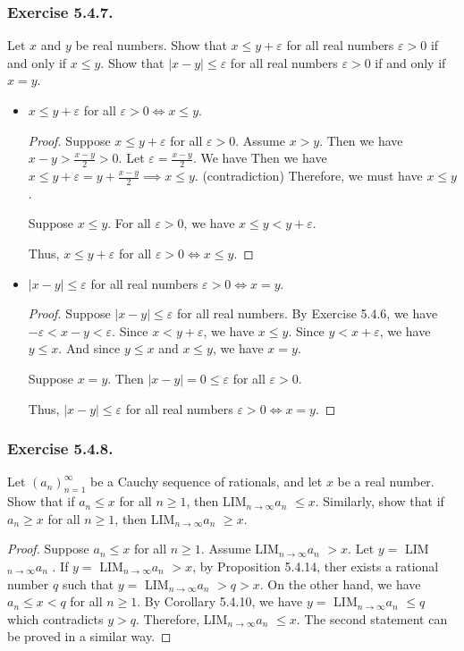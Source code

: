 \documentclass[12pt, letter]{article}
\newcommand{\an}{$(a_n)_{n=1}^\infty$ }
\newcommand{\la}{LIM$_{n\to\infty}a_n$  }
\begin{document}
\subsubsection*{Exercise 5.4.7.}
Let $x$ and $y$ be real numbers. Show that $x\leq y+\varepsilon$ for all real numbers $\varepsilon>0$ if and only if $x\leq y$. Show that $|x-y|\leq \varepsilon$
for all real numbers $\varepsilon>0$ if and only if $x=y$.
\begin{itemize}
    \item $x\leq y+\varepsilon$ for all $\varepsilon>0\iff x\leq y$.
    \begin{proof}
        Suppose $x\leq y+\varepsilon$ for all $\varepsilon>0$. Assume $x>y$. Then we have $x-y>\frac{x-y}{2}>0$. Let $\varepsilon=\frac{x-y}{2}$. We have 
        Then we have $x\leq y+\varepsilon=y+\frac{x-y}{2}\implies x\leq y$. (contradiction) Therefore, we must have $x\leq y$.

        Suppose $x\leq y$. For all $\varepsilon>0$, we have $x\leq y<y+\varepsilon$.

        Thus, $x\leq y+\varepsilon$ for all $\varepsilon>0\iff x\leq y$.
    \end{proof}
    \item $|x-y|\leq \varepsilon$ for all real numbers $\varepsilon>0 \iff x=y$.
    \begin{proof}
        Suppose $|x-y|\leq \varepsilon$ for all real numbers. By Exercise 5.4.6, we have $-\varepsilon<x-y<\varepsilon$. Since $x<y+\varepsilon$, we have $x\leq y$.
        Since $y<x+\varepsilon$, we have $y\leq x$. And since $y\leq x$ and $x\leq y$, we have $x=y$.

        Suppose $x=y$. Then $|x-y|=0\leq \varepsilon$ for all $\varepsilon>0$.

        Thus, $|x-y|\leq \varepsilon$ for all real numbers $\varepsilon>0 \iff x=y$.
    \end{proof}
\end{itemize}
\subsubsection*{Exercise 5.4.8.}
Let \an be a Cauchy sequence of rationals, and let $x$ be a real number. Show that if $a_n\leq x$ for all $n\geq 1$, then \la $\leq x$. Similarly, 
show that if $a_n\geq x$ for all $n\geq 1$, then \la $\geq x$.
\begin{proof}
    Suppose $a_n\leq x$ for all $n\geq 1$. Assume \la $> x$. Let $y=$ \la. If $y=$ \la $>x$, by Proposition 5.4.14, ther exists a rational number $q$
    such that $y=$ \la $> q>x$. On the other hand, we have $a_n\leq x<q$ for all $n\geq 1$. By Corollary 5.4.10, we have $y=$ \la $\leq q$ which contradicts 
    $y>q$. Therefore, \la $\leq x$. The second statement can be proved in a similar way.
\end{proof}
\end{document}
